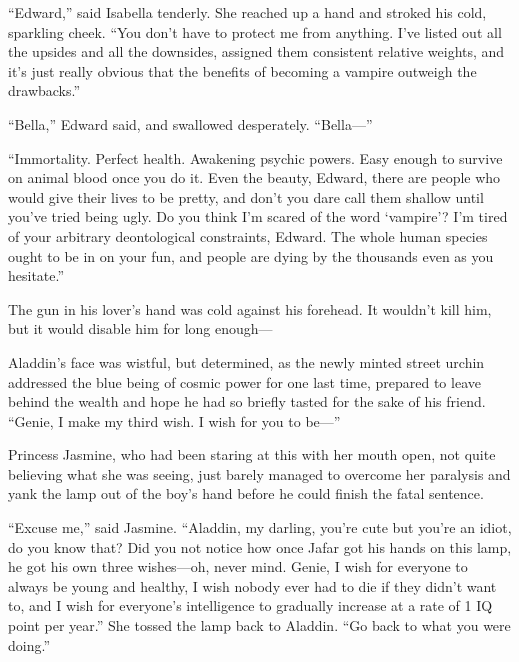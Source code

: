 “Edward,” said Isabella tenderly. She reached up a hand and stroked his cold, sparkling cheek. “You don’t have to protect me from anything. I’ve listed out all the upsides and all the downsides, assigned them consistent relative weights, and it’s just really obvious that the benefits of becoming a vampire outweigh the drawbacks.”

“Bella,” Edward said, and swallowed desperately. “Bella—”

“Immortality. Perfect health. Awakening psychic powers. Easy enough to survive on animal blood once you do it. Even the beauty, Edward, there are people who would give their lives to be pretty, and don’t you dare call them shallow until you’ve tried being ugly. Do you think I’m scared of the word ‘vampire’? I’m tired of your arbitrary deontological constraints, Edward. The whole human species ought to be in on your fun, and people are dying by the thousands even as you hesitate.”

The gun in his lover’s hand was cold against his forehead. It wouldn’t kill him, but it would disable him for long enough—


Aladdin’s face was wistful, but determined, as the newly minted street urchin addressed the blue being of cosmic power for one last time, prepared to leave behind the wealth and hope he had so briefly tasted for the sake of his friend. “Genie, I make my third wish. I wish for you to be—”

Princess Jasmine, who had been staring at this with her mouth open, not quite believing what she was seeing, just barely managed to overcome her paralysis and yank the lamp out of the boy’s hand before he could finish the fatal sentence.

“Excuse me,” said Jasmine. “Aladdin, my darling, you’re cute but you’re an idiot, do you know that? Did you not notice how once Jafar got his hands on this lamp, he got his own three wishes—oh, never mind. Genie, I wish for everyone to always be young and healthy, I wish nobody ever had to die if they didn’t want to, and I wish for everyone’s intelligence to gradually increase at a rate of 1 IQ point per year.” She tossed the lamp back to Aladdin. “Go back to what you were doing.”

%
%

